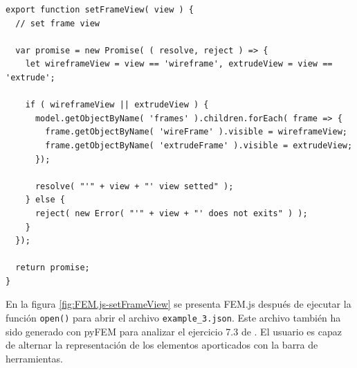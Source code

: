 \begin{lstlisting}[language={},caption=Función \texttt{setFrameView()} implementada en el archivo \texttt{FEM.js}.,label=alg:FEM.js-setFrameView, frame=single]
export function setFrameView( view ) {
  // set frame view
  
  var promise = new Promise( ( resolve, reject ) => {
    let wireframeView = view == 'wireframe', extrudeView = view == 'extrude';

    if ( wireframeView || extrudeView ) {
      model.getObjectByName( 'frames' ).children.forEach( frame => {
        frame.getObjectByName( 'wireFrame' ).visible = wireframeView;
        frame.getObjectByName( 'extrudeFrame' ).visible = extrudeView;
      });
      
      resolve( "'" + view + "' view setted" );
    } else {
      reject( new Error( "'" + view + "' does not exits" ) );
    }
  });

  return promise;
}
\end{lstlisting}
\bigskip

En la figura \ref{fig:FEM.js-setFrameView} se presenta FEM.js después de ejecutar la función \verb|open()| para abrir el archivo \verb|example_3.json|. Este archivo también ha sido generado con pyFEM para analizar el ejercicio 7.3 de \cite{escamilla1995microcomputadores}. El usuario es capaz de alternar la representación de los elementos aporticados con la barra de herramientas.\\

